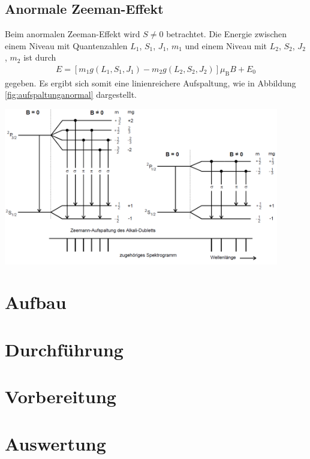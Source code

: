 \documentclass[captions=tableheading]{scrartcl}
\newcommand{\indx}[1]{\text{#1}}
\begin{document}
\subsection{Anormale Zeeman-Effekt}
Beim anormalen Zeeman-Effekt wird $S\neq 0$ betrachtet. 
Die Energie zwischen einem Niveau mit Quantenzahlen $L_1$, $S_1$, $J_1$, $m_1$ und einem Niveau mit $L_2$, $S_2$, $J_2$, $m_2$ ist durch 
\begin{align}
E=\left[ m_1 g\left(L_1,S_1,J_1 \right) - m_2 g\left(L_2,S_2,J_2 \right) \right] \mu_\indx{B}B+E_0
\end{align}
gegeben.
Es ergibt sich somit eine linienreichere Aufspaltung, wie in Abbildung \ref{fig:aufspaltunganormal} dargestellt.
\begin{center}
	\includegraphics[width=12cm]{images/aufspaltunganormal.png}
	\label{fig:aufspaltunganormal}
\end{center}
\section{Aufbau}


\section{Durchführung}

\section{Vorbereitung}

\section{Auswertung}
\end{document}
